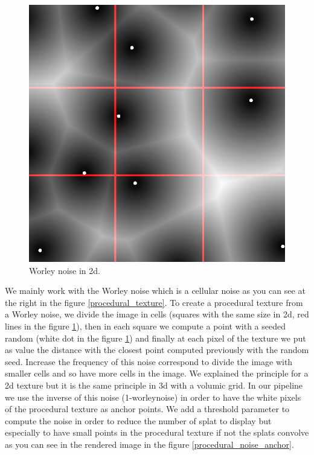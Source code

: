 
\begin{figure}[H]
    \begin{center}
    \includegraphics[scale=0.2]{images/noise/worley_explain.png}
    \end{center}
    \caption{Worley noise in 2d.}
    \label{worley_explain}
\end{figure}

We mainly work with the Worley noise which is a cellular noise as you can see at the right in the figure \ref{procedural_texture}. To create a procedural texture from a Worley noise, we divide the image in cells (squares with the same size in 2d, red lines in the figure \ref{worley_explain}), then in each square we compute a point with a seeded random (white dot in the figure \ref{worley_explain}) and finally at each pixel of the texture we put as value the distance with the closest point computed previously with the random seed. Increase the frequency of this noise correspond to divide the image with smaller cells and so have more cells in the image. We explained the principle for a 2d texture but it is the same principle in 3d with a volumic grid. In our pipeline we use the inverse of this noise (1-worleynoise) in order to have the white pixels of the procedural texture as anchor points. We add a threshold parameter to compute the noise in order to reduce the number of splat to display but especially to have small points in the procedural texture if not the splats convolve as you can see in the rendered image in the figure \ref{procedural_noise_anchor}.

